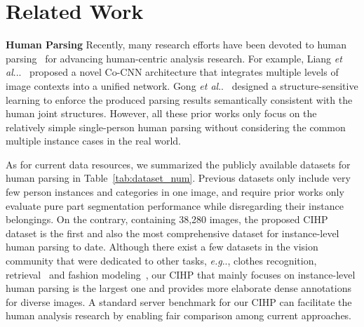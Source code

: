 \documentclass[runningheads]{llncs}
\makeatletter
\DeclareRobustCommand\onedot{\futurelet\@let@token\@onedot}
\def\@onedot{\ifx\@let@token.\else.\null\fi\xspace}
\def\eg{\emph{e.g}\onedot} \def\Eg{\emph{E.g}\onedot}
\def\etal{\emph{et al}\onedot}
\makeatother
\begin{document}
\section{Related Work}

\textbf{Human Parsing}
Recently, many research efforts have been devoted to human parsing~\cite{Co-CNN,yamaguchi2012parsing,Yamaguchiparsing13,SimoSerraACCV2014,M-CNN,xia2015zoom,chen2015attention,Gong_2017_CVPR} for advancing human-centric analysis research. For example, Liang \etal.~\cite{Co-CNN} proposed a novel Co-CNN architecture that integrates multiple levels of image contexts into a unified network. Gong \etal~\cite{Gong_2017_CVPR} designed a structure-sensitive learning to enforce the produced parsing results semantically consistent with the human joint structures. However, all these prior works only focus on the relatively simple single-person human parsing without considering the common multiple instance cases in the real world. 

As for current data resources, we summarized the publicly available datasets for human parsing in Table~\ref{tab:dataset_num}. Previous datasets only include very few person instances and categories in one image, and require prior works only evaluate pure part segmentation performance while disregarding their instance belongings. On the contrary, containing 38,280 images, the proposed CIHP dataset is the first and also the most comprehensive dataset for instance-level human parsing to date. Although there exist a few datasets in the vision community that were dedicated to other tasks, \eg, clothes recognition, retrieval~\cite{liuLQWTcvpr16DeepFashion,WhereToBuyItICCV15} and fashion modeling~\cite{simo2015neuroaesthetics}, our CIHP that mainly focuses on instance-level human parsing is the largest one and provides more elaborate dense annotations for diverse images. A standard server benchmark for our CIHP can facilitate the human analysis research by enabling fair comparison among current approaches.
\end{document}
